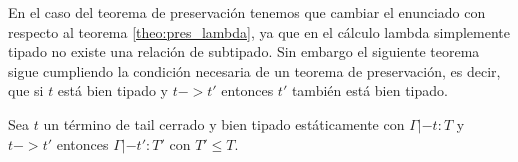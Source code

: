 \bigskip

En el caso del teorema de preservación tenemos que cambiar el enunciado con respecto al teorema \ref{theo:pres_lambda}, ya que en el cálculo lambda simplemente tipado no existe una relación de subtipado. Sin embargo el siguiente teorema sigue cumpliendo la condición necesaria de un teorema de preservación, es decir, que si $t$ está bien tipado y $t -> t'$ entonces $t'$ también está bien tipado.\\

\begin{theorem}
\label{theo:pres_tail}
  Sea $t$ un término de tail cerrado y bien tipado estáticamente con $\Gamma |- t:T$ y $t -> t'$ entonces $\Gamma |- t':T'$ con $T' \leq T$.
\end{theorem}


